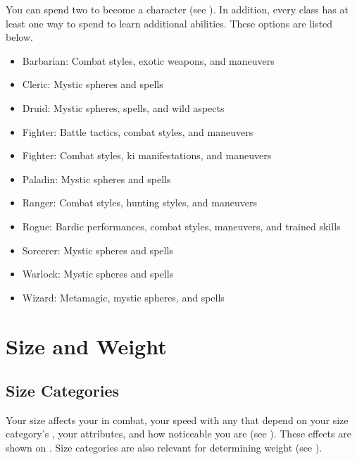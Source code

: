         You can spend two  to become a  character (see ).
        In addition, every class has at least one way to spend  to learn additional abilities.
        These options are listed below.
        \begin{itemize}
            \item Barbarian: Combat styles, exotic weapons, and maneuvers
            \item Cleric: Mystic spheres and spells
            \item Druid: Mystic spheres, spells, and wild aspects
            \item Fighter: Battle tactics, combat styles, and maneuvers
            \item Fighter: Combat styles, ki manifestations, and maneuvers
            \item Paladin: Mystic spheres and spells
            \item Ranger: Combat styles, hunting styles, and maneuvers
            \item Rogue: Bardic performances, combat styles, maneuvers, and trained skills
            \item Sorcerer: Mystic spheres and spells
            \item Warlock: Mystic spheres and spells
            \item Wizard: Metamagic, mystic spheres, and spells
        \end{itemize}

\section{Size and Weight}\label{Size and Weight}

    \subsection{Size Categories}\label{Size Categories}
        Your size affects your  in combat, your speed with any  that depend on your size category's , your attributes, and how noticeable you are (see ).
        These effects are shown on .
        Size categories are also relevant for determining weight (see ).

